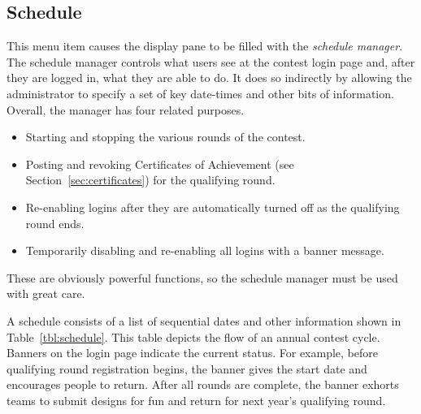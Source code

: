 \documentclass[11pt,letterpaper]{refart}
\begin{document}
\subsection{Schedule}
This menu item causes the display pane to be filled with the
\emph{schedule manager}. The schedule manager controls what users see
at the contest login page and, after they are logged in, what they are
able to do. It does so indirectly by allowing the administrator to
specify a set of key date-times and other bits of information.
Overall, the manager has four related purposes.
\begin{itemize}
\item Starting and stopping the various rounds of the contest.
\item Posting and revoking Certificates of Achievement
(see Section~\ref{sec:certificates}) for the qualifying round.
\item Re-enabling logins after they are automatically turned off
as the qualifying round ends.
\item Temporarily disabling and re-enabling all logins with a banner 
message.
\end{itemize}
These are obviously powerful functions, so the schedule manager must
be used with great care.

A schedule consists of a list of sequential dates and other
information shown in Table~\ref{tbl:schedule}. This table depicts the
flow of an annual contest cycle. Banners on the login page indicate
the current status. For example, before qualifying round registration
begins, the banner gives the start date and encourages people to
return. After all rounds are complete, the banner exhorts teams to
submit designs for fun and return for next year's qualifying round.
\end{document}
